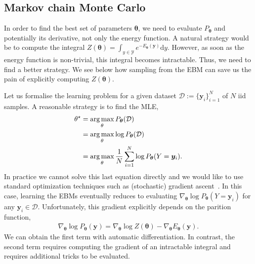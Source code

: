 \subsection{Markov chain Monte Carlo}
In order to find the best set of parameters $\bm{\theta}$, we need to evaluate $P_{\bm{\theta}}$ and potentially its derivative, not only the energy function.
A natural strategy would be to compute the integral $Z(\bm{\theta})=\int_{y\in \mathcal{Y}}e^{-E_{\bm{\theta}}(\bm{y})} \text{d}y$. However, as soon as the energy function is non-trivial, this integral becomes intractable. Thus, we need to find a better strategy. We see below how sampling from the EBM can save us the pain of explicitly computing $Z(\bm{\theta})$.

Let us formalise the learning problem for a given dataset $\mathcal{D} := \{\bm{y}_i\}_{i=1}^N$ of $N$ iid samples. A reasonable strategy is to find the MLE,
\begin{align}
  \theta^\star &= \operatorname*{arg\,max}_\theta P_{\bm{\theta}}(\mathcal{D})\\
  &= \operatorname*{arg\,max}_\theta \log P_{\bm{\theta}}(\mathcal{D})\\
  &= \operatorname*{arg\,max}_\theta \frac{1}{N} \sum^N_{i=1} \log P_{\bm{\theta}}(Y=\bm{y}_i).
\end{align}
In practice we cannot solve this last equation directly and we would like to use standard optimization techniques such as (stochastic) gradient ascent~\citep{amari1993backpropagation, bottou2012stochastic}. In this case, learning the EBMs eventually reduces to evaluating $\nabla_{\bm{\theta}} \log P_{\bm{\theta}}(Y=\bm{y}_i)$ for any $\bm{y}_i \in \mathcal{D}$. Unfortunately, this gradient explicitly depends on the parition function,
\begin{align}
  \nabla_{\bm{\theta}} \log P_{\bm{\theta}}(\bm{y}) = \nabla_{\bm{\theta}} \log Z(\bm{\theta}) -\nabla_{\bm{\theta}} E_{\bm{\theta}}(\bm{y}).
\end{align}
We can obtain the first term with automatic differentiation. In contrast, the second term requires computing the gradient of an intractable integral and requires additional tricks to be evaluated.

